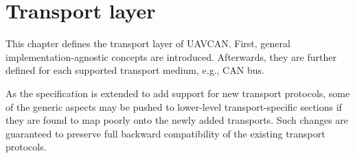 \chapter{Transport layer}\label{sec:transport_layer}

This chapter defines the transport layer of UAVCAN.
First, general implementation-agnostic concepts are introduced.
Afterwards, they are further defined for each supported transport medium, e.g., CAN bus.

As the specification is extended to add support for new transport protocols,
some of the generic aspects may be pushed to lower-level transport-specific sections
if they are found to map poorly onto the newly added transports.
Such changes are guaranteed to preserve full backward compatibility of the existing transport protocols.

\clearpage
\clearpage
